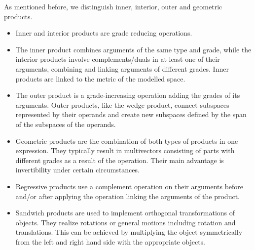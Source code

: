 As mentioned before, we distinguish inner, interior, outer and geometric products.
\begin{itemize}
    \item Inner and interior products are grade reducing operations.
    \item The inner product combines arguments of the same type and grade, while the
    interior products involve complements/duals in at least one of their arguments,
    combining and linking arguments of different grades. Inner products are linked to the
    metric of the modelled space. 
    \item The outer product is a grade-increasing operation adding the grades of its
    arguments. Outer products, like the wedge product, connect subspaces represented by
    their operands and create new subspaces defined by the span of the subspaces of the
    operands.
    \item Geometric products are the combination of both types of products in one
    expression. They typically result in multivectors consisting of parts with different
    grades as a result of the operation. Their main advantage is invertibility under
    certain circumstances.
    \item Regressive products use a complement operation on their arguments before and/or
    after applying the operation linking the arguments of the product.
    \item Sandwich products are used to implement orthogonal transformations of objects.
    They realize rotations or general motions including rotation and translations. This
    can be achieved by multiplying the object symmetrically from the left and right hand
    side with the appropriate objects.
\end{itemize}

